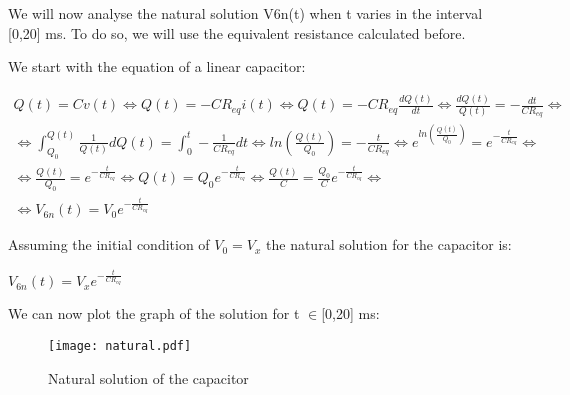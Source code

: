 \hspace{12pt} We will now analyse the natural solution V6n(t) when t varies in the interval [0,20] ms. To do so, we will use the equivalent resistance calculated before.

We start with the equation of a linear capacitor:

\begin{gather}
	Q(t)=Cv(t) \iff Q(t)=-CR_{eq}i(t) \iff Q(t)=-CR_{eq}\frac{dQ(t)}{dt} \iff \frac{dQ(t)}{Q(t)}=-\frac{dt}{CR_{eq}} \iff \nonumber \\ \iff \int_{Q_0}^{Q(t)}\frac{1}{Q(t)}dQ(t)=\int_{0}^{t}-\frac{1}{CR_{eq}}dt \iff ln(\frac{Q(t)}{Q_0})=-\frac{t}{CR_{eq}} \iff e^{ln(\frac{Q(t)}{Q_0})}=e^{-\frac{t}{CR_{eq}}} \iff \nonumber \\ \iff \frac{Q(t)}{Q_0}=e^{-\frac{t}{CR_{eq}}} \iff Q(t)=Q_0e^{-\frac{t}{CR_{eq}}} \iff \frac{Q(t)}{C}=\frac{Q_0}{C}e^{-\frac{t}{CR_{eq}}} \iff \nonumber \\ \iff V_{6n}(t)=V_0e^{-\frac{t}{CR_{eq}}}
\end{gather}

Assuming the initial condition of $V_0=V_x$ the natural solution for the capacitor is:

\vspace{10pt}

$V_{6n}(t)=V_xe^{-\frac{t}{CR_{eq}}}$

\vspace{10pt}

We can now plot the graph of the solution for t $\in$[0,20] ms:

\begin{figure}[h]
	\centering
	\texttt{[image: natural.pdf]}
	\caption{Natural solution of the capacitor}
	\label{fig:natural}
\end{figure}

\newpage

